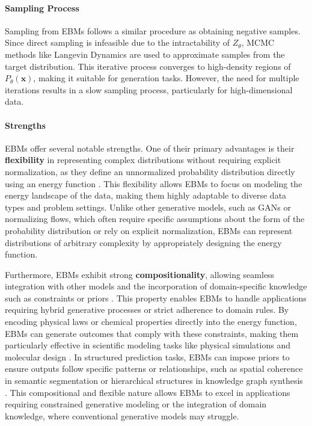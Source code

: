 \paragraph{Sampling Process}

Sampling from EBMs follows a similar procedure as obtaining negative samples. Since direct sampling is infeasible due to the intractability of \( Z_{\theta} \), MCMC methods like Langevin Dynamics are used to approximate samples from the target distribution. This iterative process converges to high-density regions of \( P_{\theta}(\mathbf{x}) \), making it suitable for generation tasks. However, the need for multiple iterations results in a slow sampling process, particularly for high-dimensional data.

\paragraph{Strengths}

EBMs offer several notable strengths. One of their primary advantages is their \textbf{flexibility} in representing complex distributions without requiring explicit normalization, as they define an unnormalized probability distribution directly using an energy function \cite{lecun2006tutorial}. This flexibility allows EBMs to focus on modeling the energy landscape of the data, making them highly adaptable to diverse data types and problem settings. Unlike other generative models, such as GANs or normalizing flows, which often require specific assumptions about the form of the probability distribution or rely on explicit normalization, EBMs can represent distributions of arbitrary complexity by appropriately designing the energy function.

Furthermore, EBMs exhibit strong \textbf{compositionality}, allowing seamless integration with other models and the incorporation of domain-specific knowledge such as constraints or priors \cite{du2019implicit, grathwohl2020your}. This property enables EBMs to handle applications requiring hybrid generative processes or strict adherence to domain rules. By encoding physical laws or chemical properties directly into the energy function, EBMs can generate outcomes that comply with these constraints, making them particularly effective in scientific modeling tasks like physical simulations and molecular design \cite{du2019implicit}. In structured prediction tasks, EBMs can impose priors to ensure outputs follow specific patterns or relationships, such as spatial coherence in semantic segmentation or hierarchical structures in knowledge graph synthesis \cite{grathwohl2020your, lecun2006tutorial}. This compositional and flexible nature allows EBMs to excel in applications requiring constrained generative modeling or the integration of domain knowledge, where conventional generative models may struggle.

